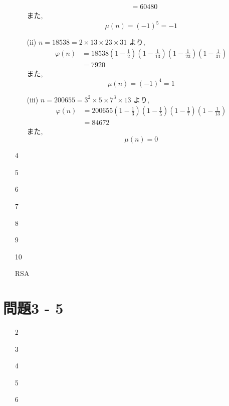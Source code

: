 \documentclass[12pt,a4paper]{jsarticle}
\begin{document}
\begin{enumerate}
\begin{itemize}
\begin{align*}
 &= 60480
 \end{align*}
 また,
 \[\mu(n) = (-1)^5 = -1 \]
 \item[(ii)]
 $n = 18538 = 2 \times 13 \times 23 \times 31$ より,
 \begin{align*}
 \varphi(n) &= 18538 \left(1-\frac{1}{2}\right) \left(1-\frac{1}{13}\right)
   \left(1-\frac{1}{23}\right) \left(1-\frac{1}{31}\right) \\
 &= 7920
 \end{align*}
 また,
 \[\mu(n) = (-1)^4 = 1 \]
 \item[(iii)]
 $n = 200655 = 3^2 \times 5 \times 7^3 \times 13$ より,
 \begin{align*}
 \varphi(n) &= 200655 \left(1-\frac{1}{3}\right) \left(1-\frac{1}{5}\right)
   \left(1-\frac{1}{7}\right) \left(1-\frac{1}{13}\right) \\
 &= 84672
 \end{align*}
 また,
 \[\mu(n) = 0 \]
 \end{itemize}
 \item[4]  \mbox{} \\
 \item[5]  \mbox{} \\
 \item[6]  \mbox{} \\
 \item[7]  \mbox{} \\
 \item[8]  \mbox{} \\
 \item[9]  \mbox{} \\
 \item[10]  \mbox{} \\
 \item[RSA]  \mbox{} \\
\end{enumerate}
\pagebreak


\section*{問題3 - 5}
\begin{enumerate}
 \item[2]  \mbox{} \\
 \item[3]  \mbox{} \\
 \item[4]  \mbox{} \\
 \item[5]  \mbox{} \\
 \item[6]  \mbox{} \\
\end{enumerate}
\pagebreak
\end{document}
